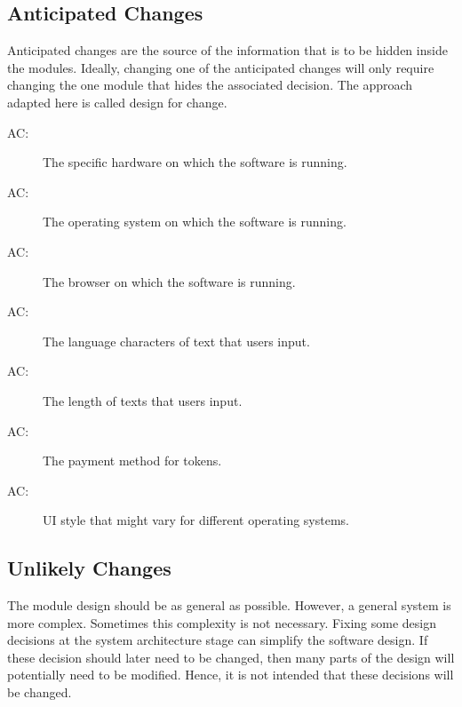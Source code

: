 \documentclass[12pt, titlepage]{article}
\newcounter{acnum}
\newcommand{\actheacnum}{AC\theacnum}
\begin{document}
\subsection{Anticipated Changes} \label{SecAchange}

Anticipated changes are the source of the information that is to be hidden
inside the modules. Ideally, changing one of the anticipated changes will only
require changing the one module that hides the associated decision. The approach
adapted here is called design for
change.

\begin{description}
\item[ \actheacnum \label{acHardware}:] The specific hardware on which the software is running.

\item[ \actheacnum \label{acSystem}:] The operating system on which the software is running.

\item[ \actheacnum \label{acBrowser}:] The browser on which the software is running.

\item[ \actheacnum \label{acLanguage}:] The language characters of text that users input.

\item[ \actheacnum \label{aclength}:] The length of texts that users input.

\item[ \actheacnum \label{aclength}:] The payment method for tokens.

\item[ \actheacnum \label{aclength}:] UI style that might vary for different operating systems.



\end{description}

\subsection{Unlikely Changes} \label{SecUchange}

The module design should be as general as possible. However, a general system is
more complex. Sometimes this complexity is not necessary. Fixing some design
decisions at the system architecture stage can simplify the software design. If
these decision should later need to be changed, then many parts of the design
will potentially need to be modified. Hence, it is not intended that these
decisions will be changed.
\end{document}
